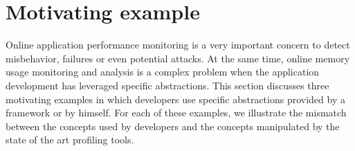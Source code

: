 \section{Motivating example}\label{sec:motivation}
Online application performance monitoring is a very important concern to detect misbehavior, failures or even potential attacks.
At the same time, online memory usage monitoring and analysis is a complex problem when the application development has leveraged specific abstractions. 
This section discusses three motivating examples in which developers use specific abstractions provided by a framework or by himself. 
For each of these examples, we illustrate the mismatch between the concepts used by developers and the concepts manipulated by the state of the art profiling tools. 

